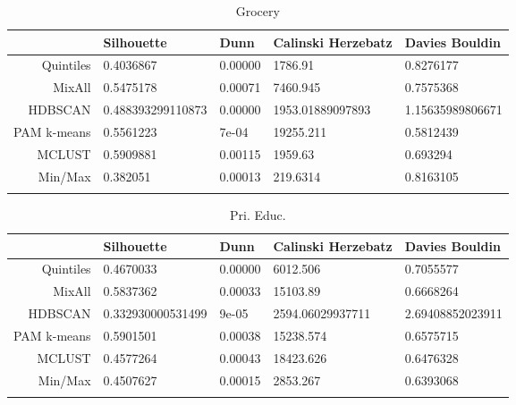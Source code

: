 \documentclass[10pt, a4paper]{article}
\begin{document}
\begin{longtable}{rllll}
  \hline
 & Silhouette & Dunn & Calinski Herzebatz & Davies Bouldin \\ 
  \hline
Quintiles & 0.4036867 & 0.00000 & 1786.91 & 0.8276177 \\ 
   \hline
MixAll & 0.5475178 & 0.00071 & 7460.945 & 0.7575368 \\ 
   \hline
HDBSCAN & 0.488393299110873 & 0.00000 & 1953.01889097893 & 1.15635989806671 \\ 
   \hline
PAM k-means & 0.5561223 & 7e-04 & 19255.211 & 0.5812439 \\ 
   \hline
MCLUST & 0.5909881 & 0.00115 & 1959.63 & 0.693294 \\ 
   \hline
Min/Max & 0.382051 & 0.00013 & 219.6314 & 0.8163105 \\ 
   \hline
\hline
\caption{Grocery} 
\end{longtable}





 \pagebreak 
 
\begin{longtable}{rllll}
  \hline
 & Silhouette & Dunn & Calinski Herzebatz & Davies Bouldin \\ 
  \hline
Quintiles & 0.4670033 & 0.00000 & 6012.506 & 0.7055577 \\ 
   \hline
MixAll & 0.5837362 & 0.00033 & 15103.89 & 0.6668264 \\ 
   \hline
HDBSCAN & 0.332930000531499 & 9e-05 & 2594.06029937711 & 2.69408852023911 \\ 
   \hline
PAM k-means & 0.5901501 & 0.00038 & 15238.574 & 0.6575715 \\ 
   \hline
MCLUST & 0.4577264 & 0.00043 & 18423.626 & 0.6476328 \\ 
   \hline
Min/Max & 0.4507627 & 0.00015 & 2853.267 & 0.6393068 \\ 
   \hline
\hline
\caption{Pri. Educ.} 
\end{longtable}





 \pagebreak 
 
\end{document}
